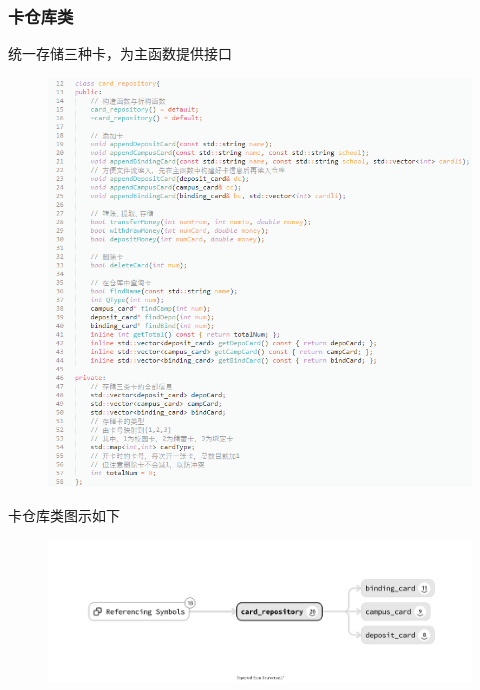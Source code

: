 \documentclass[11pt,UTF8]{ctexart}
\begin{document}
\subsubsection{卡仓库类}
\par 统一存储三种卡，为主函数提供接口
\begin{figure}[H]
\centering
\includegraphics[width=0.9\linewidth]{pic/card_repository.PNG}
\end{figure}
\par 卡仓库类图示如下
\begin{figure}[H]
\centering
\includegraphics[width=0.6\linewidth]{pic/card_repository_class.PNG}
\end{figure}
\end{document}
